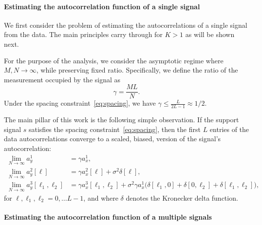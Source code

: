 \documentclass[english,11pt]{article}
\numberwithin{equation}{section}
\theoremstyle{plain}
\theoremstyle{definition}
\theoremstyle{remark}
\theoremstyle{plain}
\theoremstyle{remark}
\theoremstyle{plain}
\theoremstyle{plain}
\begin{document}
\paragraph{Estimating the autocorrelation function of a single signal}

We first consider the problem of estimating the autocorrelations of a single signal from the data. 
The main principles carry through for $K>1$ as will be shown next.  

For the purpose of the analysis, we consider  the asymptotic regime where $M,N\to\infty$, while preserving fixed ratio. 
Specifically, we define the ratio of the measurement occupied by  the signal as
\begin{equation}
\gamma = \frac{M L}{N}.
\end{equation}
Under the spacing constraint~\eqref{eq:spacing}, we have $\gamma\leq\frac{L}{2L-1}\approx 1/2$.

The main pillar of this work is the following simple observation.
If the support signal $s$ satisfies the spacing constraint~\eqref{eq:spacing}, then the first $L$ entries of the data autocorrelations converge 
to a scaled, biased, version of the signal's autocorrelation:
\begin{align}
\lim_{N\to\infty} a_y^1 & = \gamma a_{x}^1, \nonumber\\
\lim_{N\to\infty} a_y^2[\ell] & = \gamma a_{x}^2[\ell] +\sigma^2\delta[\ell], \label{eq:data_ac_k1} \\
\lim_{N\to\infty} a_y^3[\ell_1,\ell_2] & = \gamma a_{x}^3[\ell_1,\ell_2] + \sigma^2\gamma a_{x}^1 \big(\delta[\ell_1,0]+\delta[0,\ell_2]+\delta[\ell_1,\ell_2]\big), \nonumber
\end{align}
for $\ell,\ell_1,\ell_2=0,\ldots L-1$, and where $\delta$ denotes the Kronecker delta function. 

\paragraph{Estimating the autocorrelation function of a multiple signals}
\end{document}
